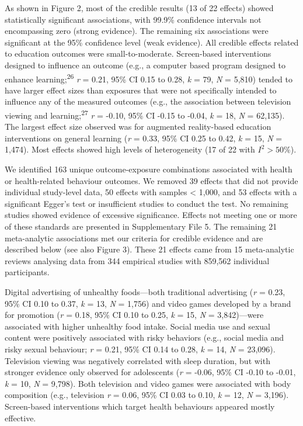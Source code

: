 \documentclass[
  english,
  man]{apa6}
\begin{document}
As shown in Figure 2, most of the credible results (13 of 22 effects) showed statistically significant associations, with 99.9\% confidence intervals not encompassing zero (strong evidence).
The remaining six associations were significant at the 95\% confidence level (weak evidence).
All credible effects related to education outcomes were small-to-moderate.
Screen-based interventions designed to influence an outcome (e.g., a computer based program designed to enhance learning;\textsuperscript{26} \emph{r} = 0.21, 95\% CI 0.15 to 0.28, \emph{k} = 79, \emph{N} = 5,810) tended to have larger effect sizes than exposures that were not specifically intended to influence any of the measured outcomes (e.g., the association between television viewing and learning;\textsuperscript{27} \emph{r} = -0.10, 95\% CI -0.15 to -0.04, \emph{k} = 18, \emph{N} = 62,135).
The largest effect size observed was for augmented reality-based education interventions on general learning (\emph{r} = 0.33, 95\% CI 0.25 to 0.42, \emph{k} = 15, \emph{N} = 1,474).
Most effects showed high levels of heterogeneity (17 of 22 with \(I^2 > 50\%\)).

We identified 163 unique outcome-exposure combinations associated with health or health-related behaviour outcomes.
We removed 39 effects that did not provide individual study-level data, 50 effects with samples \textless{} 1,000, and 53 effects with a significant Egger's test or insufficient studies to conduct the test.
No remaining studies showed evidence of excessive significance.
Effects not meeting one or more of these standards are presented in Supplementary File 5.
The remaining 21 meta-analytic associations met our criteria for credible evidence and are described below (see also Figure 3).
These 21 effects came from 15 meta-analytic reviews analysing data from 344 empirical studies with 859,562 individual participants.

Digital advertising of unhealthy foods---both traditional advertising (\emph{r} = 0.23, 95\% CI 0.10 to 0.37, \emph{k} = 13, \emph{N} = 1,756) and video games developed by a brand for promotion (\emph{r} = 0.18, 95\% CI 0.10 to 0.25, \emph{k} = 15, \emph{N} = 3,842)---were associated with higher unhealthy food intake.
Social media use and sexual content were positively associated with risky behaviors (e.g., social media and risky sexual behaviour; \emph{r} = 0.21, 95\% CI 0.14 to 0.28, \emph{k} = 14, \emph{N} = 23,096).
Television viewing was negatively correlated with sleep duration, but with stronger evidence only observed for adolescents (\emph{r} = -0.06, 95\% CI -0.10 to -0.01, \emph{k} = 10, \emph{N} = 9,798).
Both television and video games were associated with body composition (e.g., television \emph{r} = 0.06, 95\% CI 0.03 to 0.10, \emph{k} = 12, \emph{N} = 3,196).
Screen-based interventions which target health behaviours appeared mostly effective.
\end{document}
